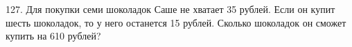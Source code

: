 127. Для покупки семи шоколадок Саше не хватает 35 рублей. Если он купит шесть шоколадок, то у него останется 15 рублей. Сколько шоколадок он сможет купить на 610 рублей?\\
